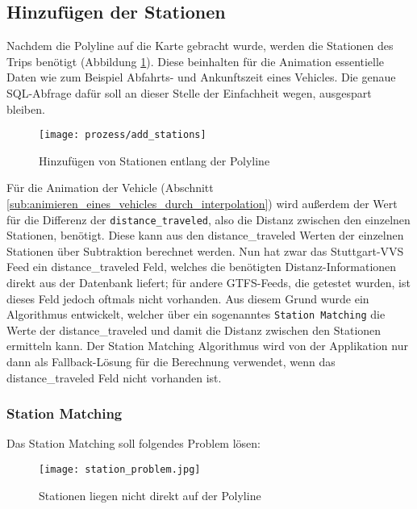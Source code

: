 \subsection{Hinzufügen der Stationen}
\label{sub:hinzufügen_der_stationen}
  Nachdem die Polyline auf die Karte gebracht wurde, werden die Stationen des Trips benötigt (Abbildung \ref{fig:prozess/add_stations}). Diese beinhalten für die Animation essentielle Daten wie zum Beispiel Abfahrts- und Ankunftszeit eines Vehicles. Die genaue SQL-Abfrage dafür soll an dieser Stelle der Einfachheit wegen, ausgespart bleiben.

  \begin{figure}[htbp]
    \begin{center}
      \texttt{[image: prozess/add\_stations]}
      \caption{Hinzufügen von Stationen entlang der Polyline}
      \label{fig:prozess/add_stations}
    \end{center}
  \end{figure}

  Für die Animation der Vehicle (Abschnitt \ref{sub:animieren_eines_vehicles_durch_interpolation}) wird außerdem der Wert für die Differenz der \texttt{distance\_traveled}, also die Distanz zwischen den einzelnen Stationen, benötigt. Diese kann aus den distance\_traveled Werten der einzelnen Stationen über Subtraktion berechnet werden. Nun hat zwar das Stuttgart-VVS Feed ein distance\_traveled Feld, welches die benötigten Distanz-Informationen direkt aus der Datenbank liefert; für andere GTFS-Feeds, die getestet wurden, ist dieses Feld jedoch oftmals nicht vorhanden. Aus diesem Grund wurde ein Algorithmus entwickelt, welcher über ein sogenanntes \texttt{Station Matching} die Werte der distance\_traveled und damit die Distanz zwischen den Stationen ermitteln kann. Der Station Matching Algorithmus wird von der Applikation nur dann als Fallback-Lösung für die Berechnung verwendet, wenn das distance\_traveled Feld nicht vorhanden ist.

  \subsubsection*{Station Matching}
  \label{ssub:station_matching}
    Das Station Matching soll folgendes Problem lösen:

    \begin{figure}[htbp]
      \begin{center}
        \texttt{[image: station\_problem.jpg]}
        \caption{Stationen liegen nicht direkt auf der Polyline}
        \label{fig:station_problem}
      \end{center}
    \end{figure}
    

